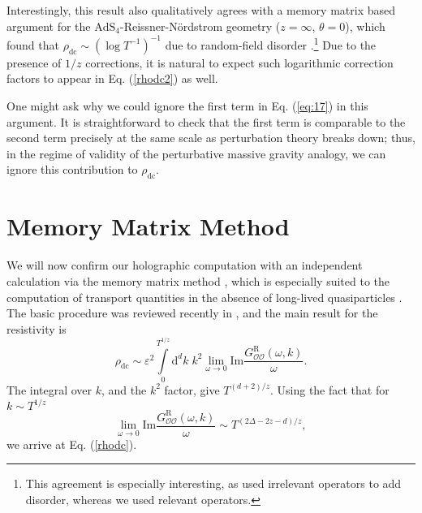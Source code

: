 \documentclass[10pt, oneside]{book}
\begin{document}
\begin{doublespace}
Interestingly, this result also qualitatively agrees with a memory matrix based argument for the $\mathrm{AdS}_4$-Reissner-N\"ordstrom geometry ($z=\infty$, $\theta=0$), which found that $\rho_{\mathrm{dc}} \sim (\log T^{-1})^{-1}$ due to random-field disorder \cite{Hartnoll:2012rj}.\footnote{This agreement is especially interesting, as \cite{Hartnoll:2012rj} used irrelevant operators to add disorder, whereas we used relevant operators.}   
Due to the presence of $1/z$ corrections, it is natural to expect such logarithmic correction factors to appear in Eq. (\ref{rhodc2}) as well.

One might ask why we could ignore the first term in Eq. (\ref{eq:17}) in this argument.   It is straightforward to check that the first term is comparable to the second term precisely at the same scale as perturbation theory breaks down; thus, in the regime of validity of the perturbative massive gravity analogy, we can ignore this contribution to $\rho_{\mathrm{dc}}$.

\section{Memory Matrix Method}

We will now confirm our holographic computation with an independent calculation via the memory matrix method \cite{forster1995}, which is especially suited to the computation of transport quantities in the absence of long-lived quasiparticles \cite{hkms,rosch2007,Hartnoll:2012rj}. 
The basic procedure was reviewed recently in \cite{Hartnoll:2014gba}, and the main result for the resistivity is
\begin{equation}
\rho_{\mathrm{dc}} \sim \varepsilon^2 \int\limits_0^{T^{1/z}} \mathrm{d}^dk\; k^2 \lim_{\omega\rightarrow 0} \mathrm{Im}\frac{G^{\mathrm{R}}_{\mathcal{O}\mathcal{O}}(\omega,k)}{\omega}.   \label{eq50}
\end{equation}The integral over $k$, and the $k^2$ factor, give $T^{(d+2)/z}$.   Using the fact that for $k\sim T^{1/z}$ \cite{sachdevye, sachdev2} \begin{equation}
\lim_{\omega\rightarrow 0} \mathrm{Im}\frac{G^{\mathrm{R}}_{\mathcal{O}\mathcal{O}}(\omega,k)}{\omega} \sim T^{(2\Delta-2z-d)/z},
\end{equation}we arrive at Eq. (\ref{rhodc}).  


\end{doublespace}
\end{document}
